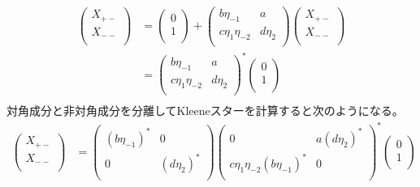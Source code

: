 {\begin{equation*}
\begin{split}
\begin{pmatrix}
			X_{+-} \\ X_{--} \\
		\end{pmatrix} &= \begin{pmatrix}
			0 \\ 1 \\
		\end{pmatrix} + \begin{pmatrix}
			b\eta_{-1} & a \\ c\eta_{1}\eta_{-2} & d\eta_{2} \\
		\end{pmatrix} \begin{pmatrix}
			X_{+-} \\ X_{--} \\
		\end{pmatrix} \\
		&= \begin{pmatrix}
			b\eta_{-1} & a \\ c\eta_{1}\eta_{-2} & d\eta_{2} \\
		\end{pmatrix}^* \begin{pmatrix}
			0 \\ 1 \\
		\end{pmatrix} \\
	\end{split}\end{equation*}
	対角成分と非対角成分を分離してKleeneスターを計算すると次のようになる。
	\begin{equation}\label{eq:二次元部分の消去}\begin{split}
		\begin{pmatrix}
			X_{+-} \\ X_{--} \\
		\end{pmatrix}	&= \begin{pmatrix}
			(b\eta_{-1})^* & 0 \\ 0 & (d\eta_{2})^* \\
		\end{pmatrix} \begin{pmatrix}
			0 & a(d\eta_{2})^* \\ c\eta_1\eta_{-2}(b\eta_{-1})^* & 0 \\
		\end{pmatrix}^* \begin{pmatrix}
			0 \\ 1 \\
		\end{pmatrix} \\

\end{split}
\end{equation}}
